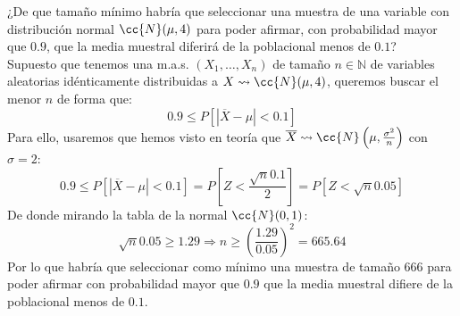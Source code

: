 \begin{ejercicio}
    ¿De que tamaño mínimo habría que seleccionar una muestra de una variable con distribución normal $\cc{N}(\mu, 4)$ para poder afirmar, con probabilidad mayor que $0.9$, que la media muestral diferirá de la poblacional menos de $0.1$?\\

    \noindent
    Supuesto que tenemos una m.a.s. $(X_1, \ldots, X_n)$ de tamaño $n\in \mathbb{N}$ de variables aleatorias idénticamente distribuidas a $X\rightsquigarrow\cc{N}(\mu, 4)$, queremos buscar el menor $n$ de forma que:
    \begin{equation*}
        0.9 \leq P\left[|\overline{X}-\mu| < 0.1\right]
    \end{equation*}
    Para ello, usaremos que hemos visto en teoría que $\overline{X}\rightsquigarrow\cc{N}\left(\mu, \frac{\sigma^2}{n}\right)$ con $\sigma=2$:
    \begin{equation*}
        0.9 \leq P[|\overline{X}-\mu| < 0.1] = P\left[Z < \dfrac{\sqrt{n}0.1}{2}\right] = P\left[Z<\sqrt{n}0.05\right]
    \end{equation*}
    De donde mirando la tabla de la normal $\cc{N}(0,1)$:
    \begin{equation*}
        \sqrt{n}0.05 \geq 1.29 \Longrightarrow n \geq {\left(\dfrac{1.29}{0.05}\right)}^{2} = 665.64
    \end{equation*}
    Por lo que habría que seleccionar como mínimo una muestra de tamaño $666$ para poder afirmar con probabilidad mayor que $0.9$ que la media muestral difiere de la poblacional menos de $0.1$.
\end{ejercicio}

